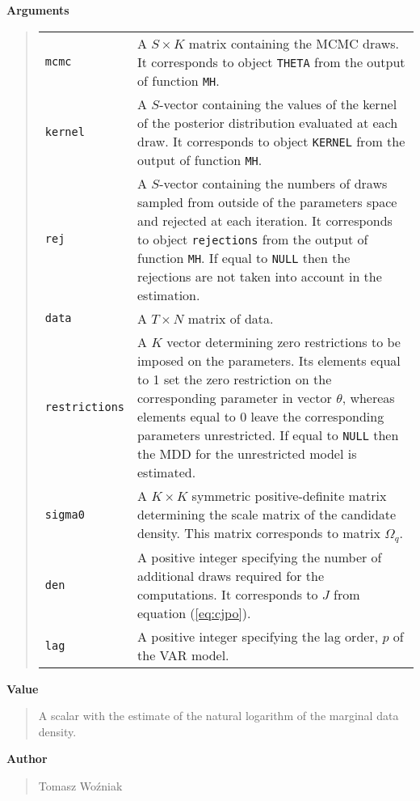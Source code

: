 \documentclass[final,3p,authoryear]{elsarticle}
\begin{document}
\bigskip\noindent\textbf{Arguments}
\begin{quote}
\begin{tabular}{p{3cm}p{10cm}}
\texttt{mcmc} & A $S\times K$ matrix containing the MCMC draws. It corresponds to object \texttt{THETA} from the output of function \texttt{MH}. \\
\texttt{kernel} & A $S$-vector containing the values of the kernel of the posterior distribution evaluated at each draw. It corresponds to object \texttt{KERNEL} from the output of function \texttt{MH}. \\
\texttt{rej} & A $S$-vector containing the numbers of draws sampled from outside of the parameters space and rejected at each iteration. It corresponds to object \texttt{rejections} from the output of function \texttt{MH}. If equal to \texttt{NULL} then the rejections are not taken into account in the estimation.\\
\texttt{data} & A $T\times N$ matrix of data. \\
\texttt{restrictions} & A $K$ vector determining zero restrictions to be imposed on the parameters. Its elements equal to 1 set the zero restriction on the corresponding parameter in vector $\theta$, whereas elements equal to 0 leave the corresponding parameters unrestricted. If equal to \texttt{NULL} then the MDD for the unrestricted model is estimated.\\
\texttt{sigma0} & A $K\times K$ symmetric positive-definite matrix determining the scale matrix of the candidate density. This matrix corresponds to matrix $\Omega_q$. \\
\texttt{den} & A positive integer specifying the number of additional draws required for the computations. It corresponds to $J$ from equation (\ref{eq:cjpo}).  \\
\texttt{lag} &  A positive integer specifying the lag order, $p$ of the VAR model.
\end{tabular}
\end{quote}





\bigskip\noindent\textbf{Value}
\begin{quote}
A scalar with the estimate of the natural logarithm of the marginal data density.
\end{quote}

\bigskip\noindent\textbf{Author}
\begin{quote}
Tomasz Wo\'zniak
\end{quote}
\end{document}

